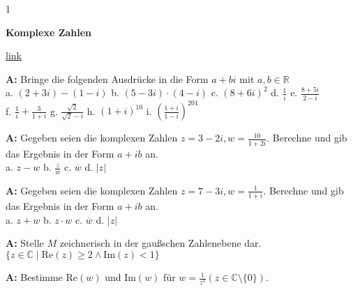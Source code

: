 \documentclass[landscape,twocolumn,a4paper]{article}
\begin{document}
\newcommand\x{1}
\setcounter {y} {1}

\parindent 0mm

\textbf{Komplexe Zahlen}


\href{file:test.html}{link}

\bigskip

\textbf{A:} Bringe die folgenden Ausdrücke in die Form $a + b i$ mit $a,b \in \mathbb{R}$ \\
a. $(2+3 i)-(1- i)$  \quad    b. $(5-3 i) \cdot (4- i)$  \quad c. $(8+6 i)^2$  \quad
d. $\frac{1}{i}$ \quad  e. $\frac{8+5 i}{2 - i}$  \\
f. $\frac{1}{i} + \frac{3}{1+i}$   \quad
g. $\frac{\sqrt{2}}{\sqrt{2}- i}$ \quad h. $(1+i)^{10}$ \quad i. $(\frac{1+i}{1-i})^{201}$
\bigskip {}

\textbf{A:} Gegeben seien die komplexen Zahlen $z = 3 - 2i, w = \frac{10}{1+2i}$. Berechne und
gib das Ergebnis in der Form $a + ib$ an. \\
a. $z-w$  \quad b. $\frac{z}{w}$ \quad c. $\overline{w}$ \quad d. $\left| z \right|$ 
\bigskip {}

\textbf{A:} Gegeben seien die komplexen Zahlen $z = 7 - 3i, w = \frac{1}{1+i}$. Berechne und
gib das Ergebnis in der Form $a + ib$ an. \\
a. $z+w$  \quad b. $z \cdot w$ \quad c. $\overline{w}$ \quad d. $\left| z \right|$ 
\bigskip {}

\textbf{A:} Stelle $M$ zeichnerisch in der gaußschen Zahlenebene dar. \\
 $\{z \in \mathbb{C} \mid  \text{Re}(z) \ge 2 \land \text{Im}(z) < 1\}$ 
\bigskip {}

\textbf{A:} Bestimme $\text{Re}(w)$ und $\text{Im}(w)$ für $w = \frac{1}{z^2} ( z \in \mathbb{C} 
\setminus \{0\})$. 
\bigskip {}

%
\end{document}
